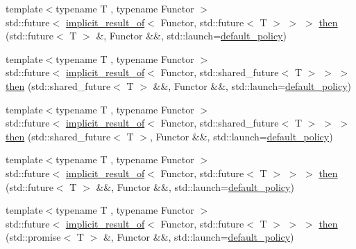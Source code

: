 \begin{DoxyCompactItemize}
\item 
{\footnotesize template$<$typename T , typename Functor $>$ }\\std\+::future$<$ \hyperlink{namespacethenable_a1ecf08d6ad8b8688d7b4df047b5feaae}{implicit\+\_\+result\+\_\+of}$<$ Functor, std\+::future$<$ T $>$ $>$ $>$ \hyperlink{namespacethenable_aa7417767a6d39589457c2569f900e9e8}{then} (std\+::future$<$ T $>$ \&, Functor \&\&, std\+::launch=\hyperlink{namespacethenable_a55a20a452e9ba9c0eff946d9b8636f06}{default\+\_\+policy})
\item 
{\footnotesize template$<$typename T , typename Functor $>$ }\\std\+::future$<$ \hyperlink{namespacethenable_a1ecf08d6ad8b8688d7b4df047b5feaae}{implicit\+\_\+result\+\_\+of}$<$ Functor, std\+::shared\+\_\+future$<$ T $>$ $>$ $>$ \hyperlink{namespacethenable_a591eb14beddb29e6d25591b5f85af87a}{then} (std\+::shared\+\_\+future$<$ T $>$ \&\&, Functor \&\&, std\+::launch=\hyperlink{namespacethenable_a55a20a452e9ba9c0eff946d9b8636f06}{default\+\_\+policy})
\item 
{\footnotesize template$<$typename T , typename Functor $>$ }\\std\+::future$<$ \hyperlink{namespacethenable_a1ecf08d6ad8b8688d7b4df047b5feaae}{implicit\+\_\+result\+\_\+of}$<$ Functor, std\+::shared\+\_\+future$<$ T $>$ $>$ $>$ \hyperlink{namespacethenable_ad47a2c35aefe434a7be8c074b1dda08a}{then} (std\+::shared\+\_\+future$<$ T $>$, Functor \&\&, std\+::launch=\hyperlink{namespacethenable_a55a20a452e9ba9c0eff946d9b8636f06}{default\+\_\+policy})
\item 
{\footnotesize template$<$typename T , typename Functor $>$ }\\std\+::future$<$ \hyperlink{namespacethenable_a1ecf08d6ad8b8688d7b4df047b5feaae}{implicit\+\_\+result\+\_\+of}$<$ Functor, std\+::future$<$ T $>$ $>$ $>$ \hyperlink{namespacethenable_a90ae1a436866f21049d7a00a350eb3db}{then} (std\+::future$<$ T $>$ \&\&, Functor \&\&, std\+::launch=\hyperlink{namespacethenable_a55a20a452e9ba9c0eff946d9b8636f06}{default\+\_\+policy})
\item 
{\footnotesize template$<$typename T , typename Functor $>$ }\\std\+::future$<$ \hyperlink{namespacethenable_a1ecf08d6ad8b8688d7b4df047b5feaae}{implicit\+\_\+result\+\_\+of}$<$ Functor, std\+::future$<$ T $>$ $>$ $>$ \hyperlink{namespacethenable_a5e3ae302e707336194333b10694e1fce}{then} (std\+::promise$<$ T $>$ \&, Functor \&\&, std\+::launch=\hyperlink{namespacethenable_a55a20a452e9ba9c0eff946d9b8636f06}{default\+\_\+policy})

\end{DoxyCompactItemize}
